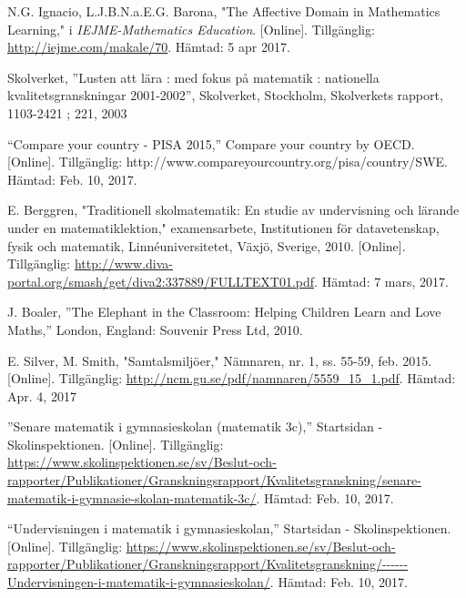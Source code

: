     N.G. Ignacio, L.J.B.N.a.E.G. Barona, "The Affective Domain in Mathematics Learning," i \textsl{IEJME-Mathematics Education}. [Online]. Tillgänglig: \url{http://iejme.com/makale/70}. Hämtad: 5 apr 2017.
    
    Skolverket, ''Lusten att l{\"a}ra : med fokus p{\aa} matematik : nationella kvalitetsgranskningar 2001-2002'',  Skolverket, Stockholm, Skolverkets rapport, 1103-2421 ; 221, 2003
    
   
    
    “Compare your country - PISA 2015,” Compare your country by OECD. [Online]. Tillgänglig: http://www.compareyourcountry.org/pisa/country/SWE. Hämtad: Feb. 10, 2017.
    
    E. Berggren, "Traditionell skolmatematik: En studie av undervisning och lärande under en matematiklektion," examensarbete, Institutionen för datavetenskap, fysik och matematik, Linnéuniversitetet, Växjö, Sverige, 2010. [Online]. Tillgänglig: \url{http://www.diva-portal.org/smash/get/diva2:337889/FULLTEXT01.pdf}. Hämtad: 7 mars, 2017.
    
    J. Boaler, ''The Elephant in the Classroom: Helping Children Learn and Love Maths,'' 
    London,
    England: Souvenir Press Ltd, 
    2010. 
    
    E. Silver, M. Smith, "Samtalsmiljöer," Nämnaren, nr. 1, ss. 55-59, feb. 2015. [Online]. Tillgänglig: \url{http://ncm.gu.se/pdf/namnaren/5559_15_1.pdf}. Hämtad: Apr. 4, 2017
    
    ''Senare matematik i gymnasieskolan (matematik 3c),'' Startsidan - Skolinspektionen. [Online]. Tillgänglig: \url{https://www.skolinspektionen.se/sv/Beslut-och-rapporter/Publikationer/Granskningsrapport/Kvalitetsgranskning/senare-matematik-i-gymnasie-skolan-matematik-3c/}. Hämtad: Feb. 10, 2017.
    
    “Undervisningen i matematik i gymnasieskolan,” Startsidan - Skolinspektionen. [Online]. Tillgänglig: \url{https://www.skolinspektionen.se/sv/Beslut-och-rapporter/Publikationer/Granskningsrapport/Kvalitetsgranskning/------Undervisningen-i-matematik-i-gymnasieskolan/}. Hämtad: Feb. 10, 2017.
    

